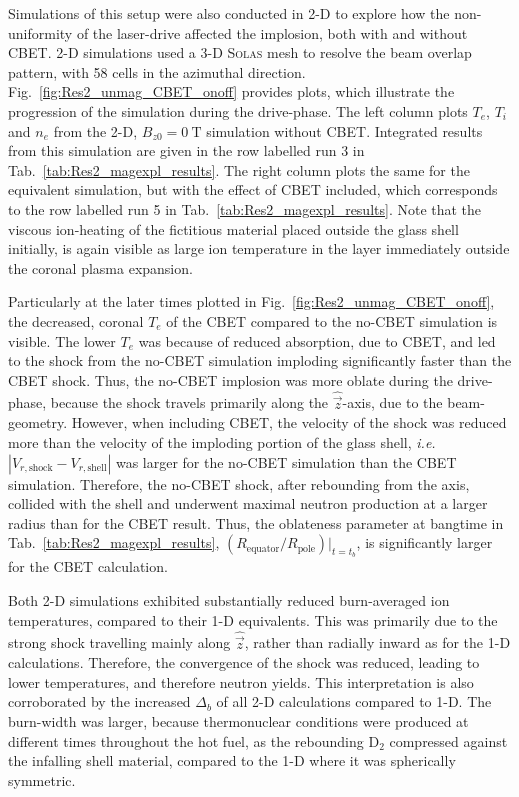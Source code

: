 Simulations of this setup were also conducted in 2-D to explore how the non-uniformity of the laser-drive affected the implosion, both with and without \ac{CBET}.
2-D simulations used a 3-D \textsc{Solas} mesh to resolve the beam overlap pattern, with 58 cells in the azimuthal direction.
Fig.~\ref{fig:Res2_unmag_CBET_onoff} provides plots, which illustrate the progression of the simulation during the drive-phase.
The left column plots $T_e$, $T_i$ and $n_e$ from the 2-D, $B_{z0}=0\ \text{T}$ simulation without \ac{CBET}.
Integrated results from this simulation are given in the row labelled run 3 in Tab.~\ref{tab:Res2_magexpl_results}.
The right column plots the same for the equivalent simulation, but with the effect of \ac{CBET} included, which corresponds to the row labelled run 5 in Tab.~\ref{tab:Res2_magexpl_results}.
Note that the viscous ion-heating of the fictitious material placed outside the glass shell initially, is again visible as large ion temperature in the layer immediately outside the coronal plasma expansion.

Particularly at the later times plotted in Fig.~\ref{fig:Res2_unmag_CBET_onoff}, the decreased, coronal $T_e$ of the \ac{CBET} compared to the no-\ac{CBET} simulation is visible.
The lower $T_e$ was because of reduced absorption, due to \ac{CBET}, and led to the shock from the no-\ac{CBET} simulation imploding significantly faster than the \ac{CBET} shock.
Thus, the no-\ac{CBET} implosion was more oblate during the drive-phase, because the shock travels primarily along the $\hat{\vec{z}}$-axis, due to the beam-geometry.
However, when including \ac{CBET}, the velocity of the shock was reduced more than the velocity of the imploding portion of the glass shell, \textit{i.e.} $|V_{r,\text{shock}} - V_{r,\text{shell}}|$ was larger for the no-\ac{CBET} simulation than the \ac{CBET} simulation.
Therefore, the no-\ac{CBET} shock, after rebounding from the axis, collided with the shell and underwent maximal neutron production at a larger radius than for the \ac{CBET} result.
Thus, the oblateness parameter at bangtime in Tab.~\ref{tab:Res2_magexpl_results}, $(R_{\text{equator}}/R_{\text{pole}})|_{t=t_b}$, is significantly larger for the \ac{CBET} calculation.

Both 2-D simulations exhibited substantially reduced burn-averaged ion temperatures, compared to their 1-D equivalents.
This was primarily due to the strong shock travelling mainly along $\hat{\vec{z}}$, rather than radially inward as for the 1-D calculations.
Therefore, the convergence of the shock was reduced, leading to lower temperatures, and therefore neutron yields.
This interpretation is also corroborated by the increased $\Delta_b$ of all 2-D calculations compared to 1-D.
The burn-width was larger, because thermonuclear conditions were produced at different times throughout the hot fuel, as the rebounding $\text{D}_2$ compressed against the infalling shell material, compared to the 1-D where it was spherically symmetric.

